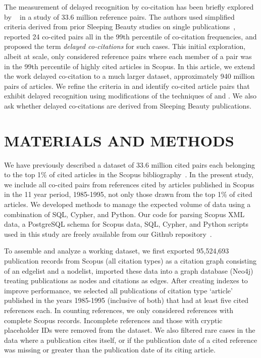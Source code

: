 \documentclass[utf8]{frontiersSCNS}
\begin{document}
The measurement of delayed recognition by co-citation has been briefly explored by ~\cite{devarakonda_2020} in a study of 33.6 million reference pairs. The authors used simplified criteria derived from prior Sleeping Beauty studies on single publications~\citep{Ke2015,Raan2004,Raan2019}, reported 24 co-cited pairs all in the 99th percentile of co-citation frequencies, and proposed the term \emph{delayed co-citations} for such cases. This initial exploration, albeit at scale, only considered reference pairs where each member of a pair was in the 99th percentile of highly cited articles in Scopus.  
In this article, we extend the work delayed co-citation to a much larger dataset, approximately 940 million pairs of articles. We refine the criteria in \cite{devarakonda_2020} and identify co-cited article pairs that exhibit delayed recognition using modifications of 
the techniques of \cite{Raan2004,Raan2019} and  \cite{Ke2015}.  We also ask whether delayed co-citations are derived from Sleeping Beauty publications. 

\section{MATERIALS AND METHODS}

We have previously described a dataset of 33.6 million cited pairs each belonging to the top 1\% of cited articles in the Scopus bibliography~\citep[Figure~2]{devarakonda_2020}. In the present study, we include all co-cited pairs from references cited by articles published in Scopus in the 11 year period, 1985-1995, not only those drawn from the top 1\% of cited articles. We developed methods to manage the expected volume of data using a combination of SQL, Cypher, and Python. Our code for parsing Scopus XML data, a PostgreSQL schema for Scopus data, SQL, Cypher, and Python scripts used in this study are freely available from our Github repository~\citep{Korobskiy2019}.

To assemble and analyze a working dataset, we first exported 95,524,693 publication records from Scopus (all citation types) as a citation graph consisting of an edgelist and a nodelist, imported these data into a graph database (Neo4j) treating publications as nodes and citations as edges. After creating indexes to improve performance, we selected all publications of citation type `article' published in the years 1985-1995 (inclusive of both) that had at least five cited references each. In counting references, we only considered references with complete Scopus records. Incomplete references and those with cryptic placeholder IDs were removed from the dataset. We also filtered rare cases in the data where a publication cites itself, or if the publication date of a cited reference was missing or greater than the publication date of its citing article. 
\end{document}
